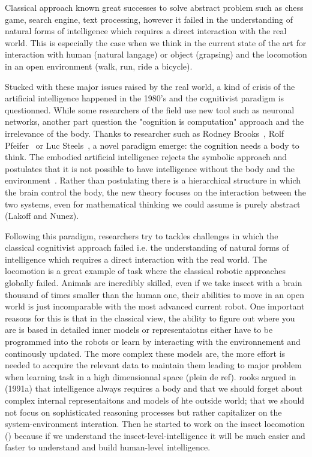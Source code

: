 Classical approach known great successes to solve abstract problem such as chess game, search engine, text processing, however it failed in the understanding of natural forms of intelligence which requires a direct interaction with the real world. This is especially the case when we think in the current state of the art for interaction with human (natural langage) or object (grapsing) and the locomotion in an open environment (walk, run, ride a bicycle).

Stucked with these major issues raised by the real world, a kind of crisis of the artificial intelligence happened in the 1980's and the cognitivist paradigm is questionned. While some researchers of the field use new tool such as neuronal networks, another part question the "cognition is computation" approach and the irrelevance of the body. Thanks to researcher such as Rodney Brooks~\cite{brooks1991intelligence}, Rolf Pfeifer~\cite{pfeifer2001understanding} or Luc Steels~\cite{steels1995artificial}, a novel paradigm emerge: the cognition needs a body to think. The embodied artificial intelligence rejects the symbolic approach and postulates that it is not possible to have intelligence without the body and the environment~\cite{pfeifer2001understanding}. Rather than postulating there is a hierarchical structure in which the brain control the body, the new theory focuses on the interaction between the two systems, even for mathematical thinking we could assume is purely abstract (Lakoff and Nunez).

Following this paradigm, researchers try to tackles challenges in which the classical cognitivist approach failed i.e. the understanding of natural forms of intelligence which requires a direct interaction with the real world. The locomotion is a great example of task where the classical robotic approaches globally failed. Animals are incredibly skilled, even if we take insect with a brain thousand of times smaller than the human one, their abilities to move in an open world is just incomparable with the most advanced current robot. One important reasons for this is that in the classical view, the ability to figure out where you are is based in detailed inner models or representaiotns either have to be programmed into the robots or learn by interacting with the environnement and continously updated. The more complex these models are, the more effort is needed to accquire the relevant data to maintain them leading to major problem when learning task in a high dimensionnal space (plein de ref). rooks argued in (1991a) that intelligence always requires a body and that we should forget about complex internal representaitons and models of hte outside world; that we should not focus on sophisticated reasoning processes but rather capitalizer on the system-environment interation. Then he started to work on the insect locomotion () because if we understand the insect-level-intelligenec it will be much easier and faster to understand and build human-level intelligence.

